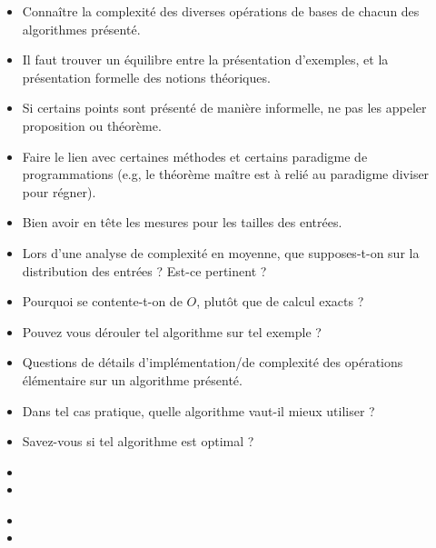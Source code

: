 \documentclass{agregfiche}
\begin{document}
\begin{itemize}
	\item Connaître la complexité des diverses opérations de bases de chacun des algorithmes présenté.
    \item Il faut trouver un équilibre entre la présentation d'exemples, et la présentation formelle des notions théoriques.
    \item Si certains points sont présenté de manière informelle, ne pas les appeler proposition ou théorème.
    \item Faire le lien avec certaines méthodes et certains paradigme 
    de programmations (e.g, le théorème maître est à relié au 
    paradigme diviser pour régner).
    \item Bien avoir en tête les mesures pour les tailles des entrées.
\end{itemize}

\secquestionsclassiques

\begin{itemize}
	\item Lors d'une analyse de complexité en moyenne, que 
	supposes-t-on sur la distribution des entrées ? Est-ce pertinent ?
    \item Pourquoi se contente-t-on de $O$, plutôt que de calcul 
    exacts ?
    \item Pouvez vous dérouler tel algorithme sur tel exemple ?
    \item Questions de détails d'implémentation/de complexité des opérations élémentaire sur un algorithme présenté.
    \item Dans tel cas pratique, quelle algorithme vaut-il mieux utiliser ?
    \item Savez-vous si tel algorithme est optimal ?
    
\end{itemize}

\secreferences

\begin{itemize}
\item 
\item 

\end{itemize}

\secdev

\begin{itemize}
\item 
\item 
\end{itemize}
\end{document}
